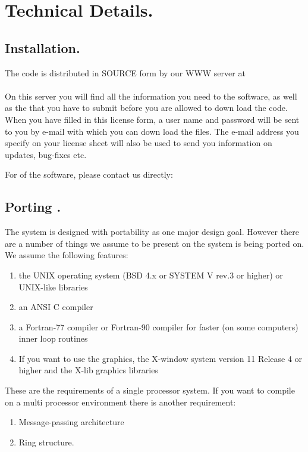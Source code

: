 \chapter{Technical Details.}
\label{ch:install}
\section{Installation.}
The {\gromacs} code is distributed in SOURCE form by our WWW server at\\
{\wwwpage}\\
On this server you will find all the information you need to 
the software, as well as the  that you have to submit
before you are allowed to down load the code. When you have filled in this
license form, a user name and password will be sent to you by e-mail
with which you can down load the files. The e-mail address you specify
on your license sheet will also be used to send you information on
updates, bug-fixes etc.

For  of the software, please contact us
directly: {\email}

\section{Porting {\gromacs}.}
The {\gromacs} system is designed with portability as one major design
goal. However there are a number of things we assume to be present on
the system {\gromacs} is being ported on. We assume the following
features:

\begin{enumerate}
\item 	the UNIX operating system (BSD 4.x or SYSTEM V rev.3 or higher) 
	or UNIX-like libraries
\item 	an ANSI C compiler 
\item	a Fortran-77 compiler or Fortran-90 compiler
	for faster (on some computers) inner loop routines
\item 	If you want to use the graphics, the X-window system version 
	11 Release 4 or higher and the X-lib graphics libraries
\end{enumerate}

These are the requirements of a single processor system. If you want
to compile {\gromacs} on a multi processor environment there is another
requirement:

\begin{enumerate}
\item Message-passing architecture
\item Ring structure.
\end{enumerate}

